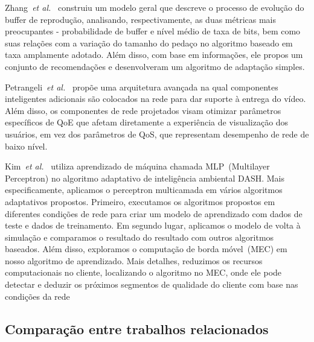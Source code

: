 Zhang~\textit{et al.}~\cite{zhangINFOCOM17} 
construiu um modelo geral que descreve o processo de evolução do buffer de reprodução, analisando, respectivamente, as duas métricas mais preocupantes - probabilidade de buffer e nível médio de taxa de bits, bem como suas relações com a variação do tamanho do pedaço no algoritmo baseado em taxa amplamente adotado. 
Além disso, com base em informações, ele propos um conjunto de recomendações e desenvolveram um algoritmo de adaptação simples.

Petrangeli~\textit{et al.}~\cite{petrangeli2019IM}
propõe uma arquitetura avançada na qual componentes inteligentes adicionais são colocados na rede para dar suporte à entrega do vídeo. Além disso, os componentes de rede projetados visam otimizar parâmetros específicos de QoE que afetam diretamente a experiência de visualização dos usuários, em vez dos parâmetros de QoS, que representam desempenho de rede de baixo nível.

Kim~\textit{et al.}~\cite{Kim2018}
utiliza aprendizado de máquina chamada MLP~(Multilayer Perceptron) no algoritmo adaptativo de inteligência ambiental DASH. Mais especificamente, aplicamos o perceptron multicamada em vários algoritmos adaptativos propostos. Primeiro, executamos os algoritmos propostos em diferentes condições de rede para criar um modelo de aprendizado com dados de teste e dados de treinamento. Em segundo lugar, aplicamos o modelo de volta à simulação e comparamos o resultado do resultado com outros algoritmos baseados. Além disso, exploramos o computação de borda móvel~(MEC) em nosso algoritmo de aprendizado. Mais detalhes, reduzimos os recursos computacionais no cliente, localizando o algoritmo no MEC, onde ele pode detectar e deduzir os próximos segmentos de qualidade do cliente com base nas condições da rede

\subsection{Comparação entre trabalhos relacionados}
\label{subsec:applications}

